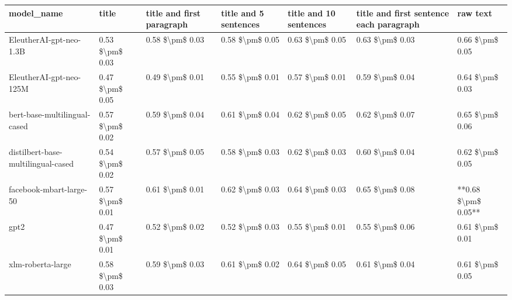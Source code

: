 \begin{tabular}{lllllll}
\toprule
                        model\_name &           title & title and first paragraph & title and 5 sentences & title and 10 sentences & title and first sentence each paragraph &            raw text \\
\midrule
           EleutherAI-gpt-neo-1.3B & 0.53 \$\textbackslash pm\$ 0.03 &           0.58 \$\textbackslash pm\$ 0.03 &       0.58 \$\textbackslash pm\$ 0.05 &        0.63 \$\textbackslash pm\$ 0.05 &                         0.63 \$\textbackslash pm\$ 0.03 &     0.66 \$\textbackslash pm\$ 0.05 \\
           EleutherAI-gpt-neo-125M & 0.47 \$\textbackslash pm\$ 0.05 &           0.49 \$\textbackslash pm\$ 0.01 &       0.55 \$\textbackslash pm\$ 0.01 &        0.57 \$\textbackslash pm\$ 0.01 &                         0.59 \$\textbackslash pm\$ 0.04 &     0.64 \$\textbackslash pm\$ 0.03 \\
      bert-base-multilingual-cased & 0.57 \$\textbackslash pm\$ 0.02 &           0.59 \$\textbackslash pm\$ 0.04 &       0.61 \$\textbackslash pm\$ 0.04 &        0.62 \$\textbackslash pm\$ 0.05 &                         0.62 \$\textbackslash pm\$ 0.07 &     0.65 \$\textbackslash pm\$ 0.06 \\
distilbert-base-multilingual-cased & 0.54 \$\textbackslash pm\$ 0.02 &           0.57 \$\textbackslash pm\$ 0.05 &       0.58 \$\textbackslash pm\$ 0.03 &        0.62 \$\textbackslash pm\$ 0.03 &                         0.60 \$\textbackslash pm\$ 0.04 &     0.62 \$\textbackslash pm\$ 0.05 \\
           facebook-mbart-large-50 & 0.57 \$\textbackslash pm\$ 0.01 &           0.61 \$\textbackslash pm\$ 0.01 &       0.62 \$\textbackslash pm\$ 0.03 &        0.64 \$\textbackslash pm\$ 0.03 &                         0.65 \$\textbackslash pm\$ 0.08 & **0.68 \$\textbackslash pm\$ 0.05** \\
                              gpt2 & 0.47 \$\textbackslash pm\$ 0.01 &           0.52 \$\textbackslash pm\$ 0.02 &       0.52 \$\textbackslash pm\$ 0.03 &        0.55 \$\textbackslash pm\$ 0.01 &                         0.55 \$\textbackslash pm\$ 0.06 &     0.61 \$\textbackslash pm\$ 0.01 \\
                 xlm-roberta-large & 0.58 \$\textbackslash pm\$ 0.03 &           0.59 \$\textbackslash pm\$ 0.03 &       0.61 \$\textbackslash pm\$ 0.02 &        0.64 \$\textbackslash pm\$ 0.05 &                         0.61 \$\textbackslash pm\$ 0.04 &     0.61 \$\textbackslash pm\$ 0.05 \\
\bottomrule
\end{tabular}

